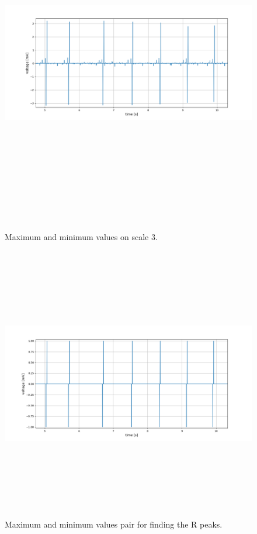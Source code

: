 \begin{figure}[htpb]
	\centering
	\includegraphics[width=15cm,height=15cm,keepaspectratio=true]{images/maximas_on_level_3}
	\caption{
		Maximum and minimum values on scale 3.
	}
	\label{fig:maximas_on_level_3}
\end{figure}

\begin{figure}[htpb]
	\centering
	\includegraphics[width=15cm,height=12cm,keepaspectratio=true]{images/max_pair}
	\caption{
		Maximum and minimum values pair for finding the R peaks.
	}
	\label{fig:max_pair}
\end{figure}

